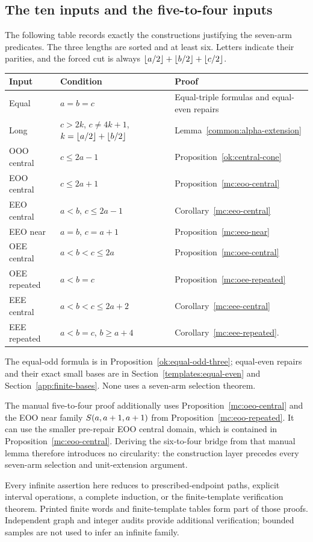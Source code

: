 \subsection{The ten inputs and the five-to-four inputs}
\label{mc:input-summary}

The following table records exactly the constructions justifying
the seven-arm predicates.  The three lengths are sorted and at
least six.  Letters indicate their parities, and the forced cut is
always $\left\lfloor a/2\right\rfloor+\left\lfloor b/2\right\rfloor+\left\lfloor c/2\right\rfloor$.
\begin{center}\small
\begin{tabular}{p{.17\linewidth}p{.42\linewidth}p{.32\linewidth}}
Input&Condition&Proof\\\midrule
Equal&$a=b=c$&Equal-triple formulas and equal-even repairs\\
Long&$c>2k$, $c\ne4k+1$, $k=\left\lfloor a/2\right\rfloor+\left\lfloor b/2\right\rfloor$
 &Lemma~\ref{common:alpha-extension}\\
OOO central&$c\le2a-1$&Proposition~\ref{ok:central-cone}\\
EOO central&$c\le2a+1$&Proposition~\ref{mc:eoo-central}\\
EEO central&$a<b$, $c\le2a-1$&Corollary~\ref{mc:eeo-central}\\
EEO near&$a=b$, $c=a+1$&Proposition~\ref{mc:eeo-near}\\
OEE central&$a<b<c\le2a$&Proposition~\ref{mc:oee-central}\\
OEE repeated&$a<b=c$&Proposition~\ref{mc:oee-repeated}\\
EEE central&$a<b<c\le2a+2$&Corollary~\ref{mc:eee-central}\\
EEE repeated&$a<b=c$, $b\ge a+4$&Corollary~\ref{mc:eee-repeated}.
\end{tabular}\end{center}
The equal-odd formula is in Proposition~\ref{ok:equal-odd-three};
equal-even repairs and their exact small bases are in
Section~\ref{templates:equal-even} and Section~\ref{app:finite-bases}.
None uses a seven-arm selection theorem.

The manual five-to-four proof additionally uses
Proposition~\ref{mc:oeo-central} and the EOO near family
$S\!\left(a,a+1,a+1\right)$ from Proposition~\ref{mc:eoo-repeated}.
It can use the smaller pre-repair EOO central domain, which is
contained in Proposition~\ref{mc:eoo-central}.
Deriving the six-to-four bridge from that manual lemma therefore
introduces no circularity: the construction layer precedes every
seven-arm selection and unit-extension argument.

Every infinite assertion here reduces to prescribed-endpoint paths,
explicit interval operations, a complete induction, or the
finite-template verification theorem.  Printed finite words and
finite-template tables form part of those proofs.  Independent graph
and integer audits provide additional verification; bounded samples
are not used to infer an infinite family.
